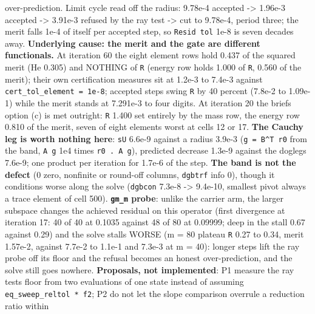 \documentclass[english,a4paper]{my_memo}
\begin{document}
\begin{itemize}
  over-prediction. Limit cycle read off the radius: 9.78e-4 accepted -\textgreater{}
  1.96e-3 accepted -\textgreater{} 3.91e-3 refused by the ray test -\textgreater{} cut to 9.78e-4,
  period three; the merit falls 1e-4 of itself per accepted step, so
  \texttt{Resid\ tol} 1e-8 is seven decades away. \textbf{Underlying cause: the merit and
  the gate are different functionals.} At iteration 60 the eight element
  rows hold 0.437 of the squared merit (He 0.305) and NOTHING of \texttt{\textbar{}\textbar{}R\textbar{}\textbar{}}
  (energy row holds 1.000 of \texttt{\textbar{}\textbar{}R\textbar{}\textbar{}}, 0.560 of the merit); their own
  certification measures sit at 1.2e-3 to 7.4e-3 against
  \texttt{cert\_tol\_element\ =\ 1e-8}; accepted steps swing \texttt{\textbar{}\textbar{}R\textbar{}\textbar{}} by 40 percent
  (7.8e-2 to 1.09e-1) while the merit stands at 7.291e-3 to four digits.
  At iteration 20 the brief\textquotesingle s option (c) is met outright: \texttt{\textbar{}\textbar{}R\textbar{}\textbar{}} 1.400 set
  entirely by the mass row, the energy row 0.810 of the merit, seven of
  eight elements worst at cells 12 or 17. \textbf{The Cauchy leg is worth
  nothing here}: \texttt{\textbar{}\textbar{}sU\textbar{}\textbar{}} 6.6e-9 against a radius 3.9e-3 (\texttt{g\ =\ B\^{}T\ r0}
  from the band, \texttt{\textbar{}\textbar{}A\ g\textbar{}\textbar{}} 1e4 times \texttt{r0\ .\ A\ g}), predicted decrease
  1.3e-9 against the dogleg\textquotesingle s 7.6e-9; one product per iteration for
  1.7e-6 of the step. \textbf{The band is not the defect} (0 zero, nonfinite or
  round-off columns, \texttt{dgbtrf} info 0), though it conditions worse along the
  solve (\texttt{dgbcon} 7.3e-8 -\textgreater{} 9.4e-10, smallest pivot always a trace element
  of cell 500). \textbf{\texttt{gm\_m} probe}: unlike the carrier arm, the larger
  subspace changes the achieved residual on this operator (first divergence
  at iteration 17: 40 of 40 at 0.1035 against 48 of 80 at 0.09999; deep in
  the stall 0.67 against 0.29) and the solve stalls WORSE (m = 80 plateau
  \texttt{\textbar{}\textbar{}R\textbar{}\textbar{}} 0.27 to 0.34, merit 1.57e-2, against 7.7e-2 to 1.1e-1 and 7.3e-3
  at m = 40): longer steps lift the ray probe off its floor and the refusal
  becomes an honest over-prediction, and the solve still goes nowhere.
  \textbf{Proposals, not implemented}: P1 measure the ray test\textquotesingle s floor from two
  evaluations of one state instead of assuming \texttt{eq\_sweep\_reltol\ *\ \textbar{}f2\textbar{}};
  P2 do not let the slope comparison overrule a reduction ratio within

\end{itemize}
\end{document}
